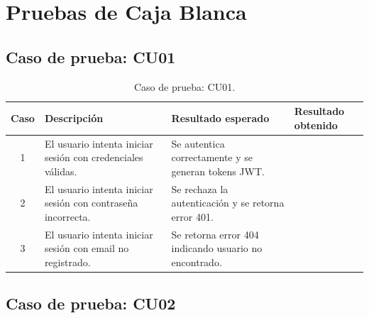 
\section{Pruebas de Caja Blanca}


\subsection{Caso de prueba: CU01}

\begin{table}[H]
\centering
\label{tab:cu01_white_test}
\renewcommand{\arraystretch}{1.3}
\begin{tabular}{|c|p{5cm}|p{6cm}|p{2.5cm}|}
\hline
\rowcolor[RGB]{217,217,217}
\textbf{Caso} & \textbf{Descripción} & \textbf{Resultado esperado} & \textbf{Resultado obtenido} \\
\hline

1 &
El usuario intenta iniciar sesión con credenciales válidas. &
Se autentica correctamente y se generan tokens JWT. &
 \\
\hline

2 &
El usuario intenta iniciar sesión con contraseña incorrecta. &
Se rechaza la autenticación y se retorna error 401. &
 \\
\hline

3 &
El usuario intenta iniciar sesión con email no registrado. &
Se retorna error 404 indicando usuario no encontrado. &
 \\
\hline

\end{tabular}
\caption{Caso de prueba: CU01.}
\end{table}


\subsection{Caso de prueba: CU02}


